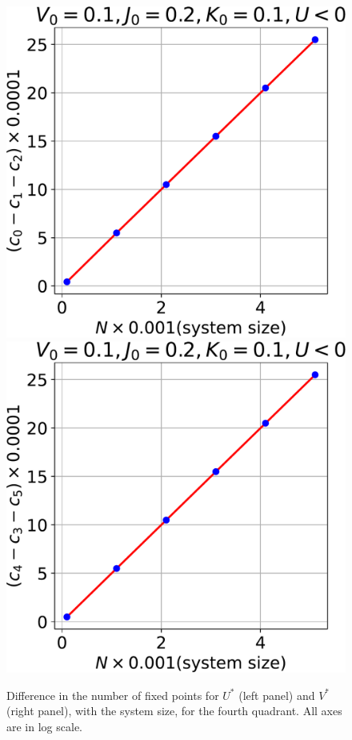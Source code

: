 \documentclass[12pt,twoside]{article}
\numberwithin{equation}{section}
\begin{document}
\begin{figure}[htpb!]
\centering
\includegraphics[scale=0.39]{../figures/frac_vs_D_quad4.pdf}
\includegraphics[scale=0.39]{../figures/frac_vs_D_quad44.pdf}
\caption{Difference in the number of fixed points for $U^*$ (left panel) and \(V^*\) (right panel), with the system size, for the fourth quadrant. All axes are in log scale.}
\label{q4_frac}
\end{figure}
\end{document}
